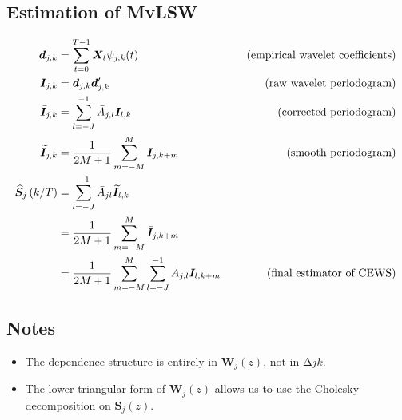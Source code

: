 \documentclass[main_document.tex]{subfiles}
\begin{document}
\subsection{Estimation of MvLSW}
\begin{align}
	\coeffs{j}{k} &= \sum_{t=0}^{T-1}\bm{X}_t \wavelet{j}{k}{t} &\quad \text{ (empirical wavelet coefficients) } \label{eq:empiricalWaveletCoeffs}\\
	\rawPeriodo{j}{k} &= \coeffs{j}{k}\coeffs{j}{k}'  &\quad \text{ (raw wavelet periodogram) } \label{eq:rawWaveletPeriodo}\\
	\correctedPeriodo{j}{k} &= \sum_{l=-J}^{-1} \bar{A}_{j,l}\rawPeriodo{l}{k} &\quad \text{ (corrected periodogram) } \label{eq:correctedPeriodo} \\
	\smoothPeriodo{j}{k} &= \frac{\displaystyle 1}{\displaystyle 2M+1} \sum_{m=-M}^{M}\rawPeriodo{j}{k+m}  &\quad \text{ (smooth periodogram) } \label{eq:smoothPeriodo} \\
	\estimCEWS{j}{k} &= \sum_{l=-J}^{-1}\bar{A}_{jl}\smoothPeriodo{l}{k} \nonumber \\
			        &= \frac{\displaystyle 1}{\displaystyle 2M+1} \sum_{m=-M}^{M}\correctedPeriodo{j}{k+m} \nonumber \\
			        &= \frac{\displaystyle 1}{\displaystyle 2M+1} \sum_{m=-M}^{M}\sum_{l=-J}^{-1} \bar{A}_{j,l}\rawPeriodo{l}{k+m} &\quad \text{ (final estimator of CEWS) } \label{eq:finalEstimator}
\end{align}

\subsection{Notes}
	\begin{itemize}
		\item The dependence structure is entirely in $\bm{W}_{j}(z)$, not in $\increment{j}{k}$.
		\item The lower-triangular form of $\bm{W}_{j}(z)$ allows us to use the Cholesky decomposition on $\bm{S}_{j}(z)$.
	\end{itemize}
\end{document}
